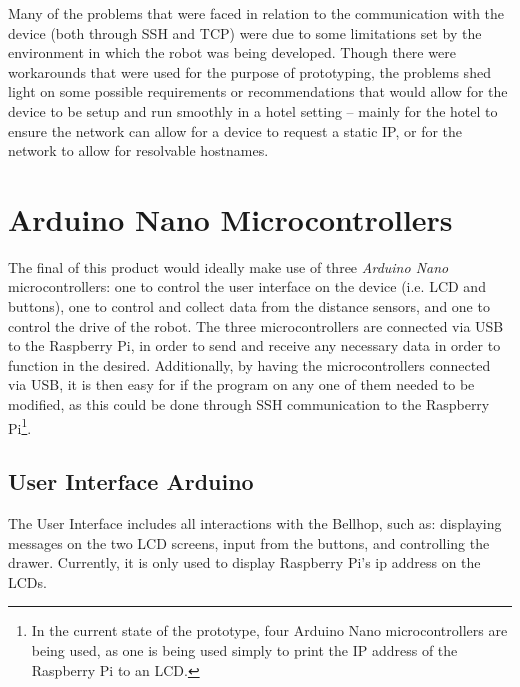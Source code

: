 \documentclass[11pt]{article}
\begin{document}
       
Many of the problems that were faced in relation to the communication with the device (both through SSH and TCP) were due to some limitations set by the environment in which the robot was being developed. Though there were workarounds that were used for the purpose of prototyping, the problems shed light on some possible requirements or recommendations that would allow for the device to be setup and run smoothly in a hotel setting -- mainly for the hotel to ensure the network can allow for a device to request a static IP, or for the network to allow for resolvable hostnames.

\newpage
\section{Arduino Nano Microcontrollers}
The final of this product would ideally make use of three \textit{Arduino Nano} microcontrollers: one to control the user interface on the device (i.e. LCD and buttons), one to control and collect data from the distance sensors, and one to control the drive of the robot. The three microcontrollers are connected via USB to the Raspberry Pi, in order to send and receive any necessary data in order to function in the desired. Additionally, by having the microcontrollers connected via USB, it is then easy for if the program on any one of them needed to be modified, as this could be done through SSH communication to the Raspberry Pi\footnote{In the current state of the prototype, four Arduino Nano microcontrollers are being used, as one is being used simply to print the IP address of the Raspberry Pi to an LCD.}.
\subsection*{User Interface Arduino}
The User Interface includes all interactions with the Bellhop, such as: displaying messages on the two LCD screens, input from the buttons, and controlling the drawer. Currently, it is only used to display Raspberry Pi's ip address on the LCDs.
\end{document}
